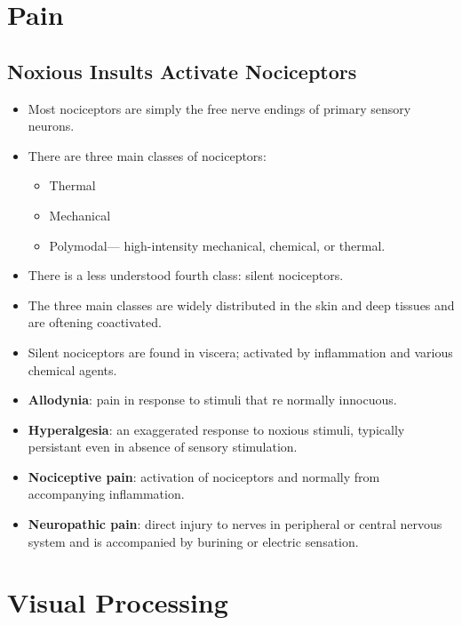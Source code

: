 \documentclass[12pt,a4paper]{article}
\begin{document}
\clearpage
\section{Pain}
\subsection{Noxious Insults Activate Nociceptors}
\begin{itemize}
    \item Most nociceptors are simply the free nerve endings of primary sensory neurons.
    \item There are three main classes of nociceptors:
        \begin{itemize}
            \item Thermal
            \item Mechanical
            \item Polymodal--- high-intensity mechanical, chemical, or thermal. 
        \end{itemize}
    \item There is a less understood fourth class: silent nociceptors.
    \item The three main classes are widely distributed in the skin and deep tissues and are oftening coactivated.
    \item Silent nociceptors are found in viscera; activated by inflammation and various chemical agents.
    \item \textbf{Allodynia}: pain in response to stimuli that re normally innocuous.
    \item \textbf{Hyperalgesia}: an exaggerated response to noxious stimuli, typically persistant even in absence of sensory stimulation. 
    \item \textbf{Nociceptive pain}: activation of nociceptors and normally from accompanying inflammation.
    \item \textbf{Neuropathic pain}: direct injury to nerves in peripheral or central nervous system and is accompanied by burining or electric sensation.
\end{itemize}

\clearpage
\section{Visual Processing}
\end{document}
